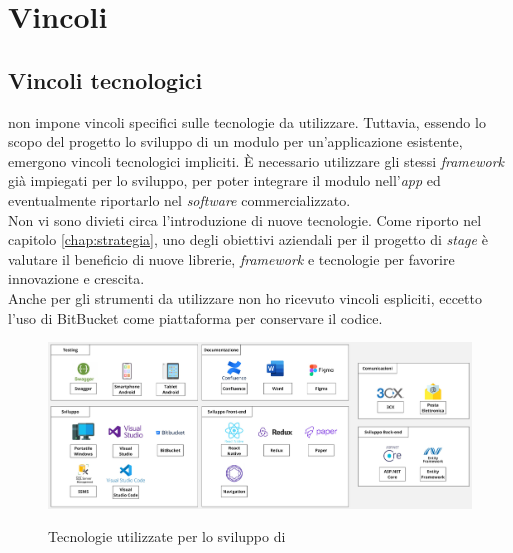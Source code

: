 \section{Vincoli}
\subsection{Vincoli tecnologici}\label{chap:vincoli tec}

{\company} non impone vincoli specifici sulle tecnologie da utilizzare. Tuttavia, essendo lo scopo del progetto lo 
sviluppo di un modulo per un'applicazione esistente, emergono vincoli tecnologici impliciti. È necessario utilizzare gli 
stessi \textit{framework} già impiegati per lo sviluppo, per poter integrare il modulo nell'\textit{app} ed eventualmente 
riportarlo nel \textit{software} commercializzato.\\
Non vi sono divieti circa l'introduzione di nuove tecnologie. Come riporto nel capitolo \ref{chap:strategia}, uno degli obiettivi
aziendali per il progetto di \textit{stage} è valutare il beneficio di nuove librerie, \textit{framework}
e tecnologie per favorire innovazione e crescita.\\
Anche per gli strumenti da utilizzare non ho ricevuto vincoli espliciti, eccetto l'uso di BitBucket
come piattaforma per conservare il codice.

\begin{figure}[H]
      \centering
      \includegraphics[alt={Tecnologie utilizzate per lo sviluppo di {\movi}}, width=\textwidth]{img/vincoli_tec.jpg}
      \caption[Tecnologie utilizzate per lo sviluppo di {\movi}]
              {Tecnologie utilizzate per lo sviluppo di {\movi}}
      \label{fig:tecnologie movi}
  \end{figure}

